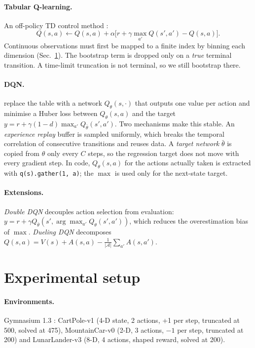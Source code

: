 \paragraph{Tabular Q-learning.} An off-policy TD control method \citep[Sec.~6.5]{sutton2018}:
\begin{equation}
Q(s,a)\leftarrow Q(s,a)+\alpha\big[r+\gamma\max_{a'}Q(s',a')-Q(s,a)\big].
\label{eq:q}
\end{equation}
Continuous observations must first be mapped to a finite index by binning each dimension
(Sec.~\ref{sec:setup}). The bootstrap term is dropped only on a \emph{true} terminal transition.
A time-limit truncation is not terminal, so we still bootstrap there.

\paragraph{DQN.} \citet{mnih2015} replace the table with a network $Q_\theta(s,\cdot)$ that outputs one
value per action and minimise a Huber loss between $Q_\theta(s,a)$ and the target
$y=r+\gamma(1-d)\max_{a'}Q_{\bar\theta}(s',a')$. Two mechanisms make this stable. An \emph{experience
replay} buffer is sampled uniformly, which breaks the temporal correlation of consecutive transitions and
reuses data. A \emph{target network} $\bar\theta$ is copied from $\theta$ only every $C$ steps, so the
regression target does not move with every gradient step. In code, $Q_\theta(s,a)$ for the actions
actually taken is extracted with \texttt{q(s).gather(1, a)}; the $\max$ is used only for the next-state target.

\paragraph{Extensions.} \emph{Double DQN} \citep{vanhasselt2016} decouples action selection from evaluation:
$y=r+\gamma Q_{\bar\theta}(s',\arg\max_{a'}Q_\theta(s',a'))$, which reduces the overestimation bias of $\max$.
\emph{Dueling DQN} \citep{wang2016} decomposes $Q(s,a)=V(s)+A(s,a)-\tfrac{1}{|\mathcal A|}\sum_{a'}A(s,a')$.

\section{Experimental setup}
\label{sec:setup}
\paragraph{Environments.} Gymnasium 1.3 \citep{towers2024gymnasium}: CartPole-v1 (4-D state,
2 actions, +1 per step, truncated at 500, solved at 475), MountainCar-v0 (2-D, 3 actions, $-1$ per step,
truncated at 200) and LunarLander-v3 (8-D, 4 actions, shaped reward, solved at 200).

